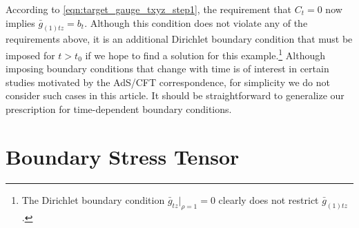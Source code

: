 \documentclass[a4paper,11pt]{article}
\numberwithin{equation}{section}
\begin{document}
According to \eqref{eqn:target_gauge_txyz_step1}, the requirement that $C_t=0$ now implies $\bar{g}_{(1)tz}=b_t$. 
Although this condition does not violate any of the requirements above, it is an additional Dirichlet boundary condition that must be imposed for $t>t_0$ if we hope to find a solution for this example.\footnote{The Dirichlet boundary condition $\bar{g}_{tz}|_{\rho=1}=0$ clearly does not restrict $\bar{g}_{(1)tz}$.}  Although imposing boundary conditions that change with time is of interest in certain studies motivated by the AdS/CFT correspondence, for simplicity we do not consider such cases in this article. It should be straightforward to generalize our prescription for  time-dependent boundary conditions. 





\section{Boundary Stress Tensor}
\label{sec:bouset2}
\end{document}
